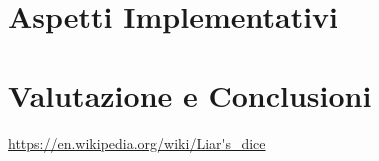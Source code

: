 \documentclass{llncs}
\begin{document}
	
	\section{Aspetti Implementativi}%
	
	
	\section{Valutazione e Conclusioni}%
	

	\begin{thebibliography}{}
		 \url{https://en.wikipedia.org/wiki/Liar's\_dice}
		\bibitem{}
	\end{thebibliography}
\end{document}
